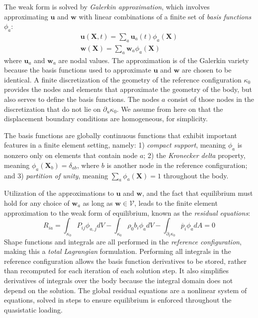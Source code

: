 The weak form is solved by \textit{Galerkin approximation}, which involves approximating $\bm{u}$ and $\bm{w}$ with linear combinations of a finite set of \textit{basis functions} $\phi_a$:
\begin{gather}
\bm{u}(\bm{X},t) = \sum\limits_{a}\bm{u}_a(t)\phi_a(\bm{X}) \\
\bm{w}(\bm{X}) = \sum\limits_{a}\bm{w}_a\phi_a(\bm{X})
\end{gather}
where $\bm{u}_a$ and $\bm{w}_a$ are nodal values. The approximation is of the Galerkin variety because the basis functions used to approximate $\bm{u}$ and $\bm{w}$ are chosen to be identical. A finite discretization of the geometry of the reference configuration $\kappa_0$ provides the nodes and elements that approximate the geometry of the body, but also serves to define the basis functions. The nodes $a$ consist of those nodes in the discretization that do not lie on $\partial_u\kappa_0$. We assume from here on that the displacement boundary conditions are homogeneous, for simplicity.

The basis functions are globally continuous functions that exhibit important features in a finite element setting, namely: 1) \textit{compact support}, meaning $\phi_a$ is nonzero only on elements that contain node $a$; 2) the \textit{Kronecker delta} property, meaning $\phi_a(\bm{X}_b) = \delta_{ab}$, where $b$ is another node in the reference configuration; and 3) \textit{partition of unity}, meaning $\sum\limits_a\phi_a(\bm{X}) = 1$ throughout the body.

Utilization of the approximations to $\bm{u}$ and $\bm{w}$, and the fact that equilibrium must hold for any choice of $\bm{w}_a$ as long as $\bm{w} \in \mathcal{V}$, leads to the finite element approximation to the weak form of equilibrium, known as the \textit{residual equations}:
\begin{equation}
R_{ia} = \int_{\kappa_0}P_{ij}\phi_{a,j}dV - \int_{\kappa_0}\rho_0b_i\phi_adV - \int_{\partial_t\kappa_0} \overline{p}_i\phi_adA = 0
\label{eqn:elresid}
\end{equation}
Shape functions and integrals are all performed in the \textit{reference configuration}, making this a \textit{total Lagrangian} formulation. Performing all integrals in the reference configuration allows the basis function derivatives to be stored, rather than recomputed for each iteration of each solution step. It also simplifies derivatives of integrals over the body because the integral domain does not depend on the solution. The global residual equations are a nonlinear system of equations, solved in steps to ensure equilibrium is enforced throughout the quasistatic loading.

